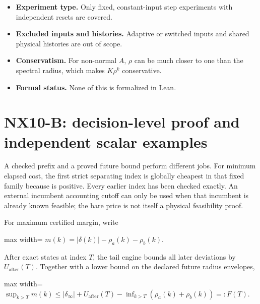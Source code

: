 \documentclass[
  11pt,
  a4paper,
]{report}
\providecommand{\tightlist}{%
  \setlength{\itemsep}{0pt}\setlength{\parskip}{0pt}}
\let\singularitytexttt\texttt
\renewcommand{\texttt}[1]{\singularitytexttt{\seqsplit{#1}}}
\begin{document}
\begin{itemize}
\tightlist
\item
  \textbf{Experiment type.} Only fixed, constant-input step experiments
  with independent resets are covered.
\item
  \textbf{Excluded inputs and histories.} Adaptive or switched inputs
  and shared physical histories are out of scope.
\item
  \textbf{Conservatism.} For non-normal \(A\), \(\rho\) can be much
  closer to one than the spectral radius, which makes \(K\rho^k\)
  conservative.
\item
  \textbf{Formal status.} None of this is formalized in Lean.
\end{itemize}

\hypertarget{nx10-b-decision-level-proof-and-independent-scalar-examples}{%
\section{NX10-B: decision-level proof and independent scalar
examples}\label{nx10-b-decision-level-proof-and-independent-scalar-examples}}

A checked prefix and a proved future bound perform different jobs. For
minimum elapsed cost, the first strict separating index is globally
cheapest in that fixed family because \texttt{IndexCost.per\_index} is
positive. Every earlier index has been checked exactly. An external
incumbent accounting cutoff can only be used when that incumbent is
already known feasible; the bare price is not itself a physical
feasibility proof.

For maximum certified margin, write

\begin{center}
\begin{adjustbox}{max width=\linewidth}
$\displaystyle
m(k)=|\delta(k)|-\rho_a(k)-\rho_b(k).
$
\end{adjustbox}
\end{center}

After exact states at index \(T\), the tail engine bounds all later
deviations by \(U_{\mathrm{after}}(T)\). Together with a lower bound on
the declared future radius envelopes,

\begin{center}
\begin{adjustbox}{max width=\linewidth}
$\displaystyle
\sup_{k>T}m(k)\le |\delta_\infty|+U_{\mathrm{after}}(T)
-\inf_{k>T}(\rho_a(k)+\rho_b(k))=:F(T).
$
\end{adjustbox}
\end{center}
\end{document}
